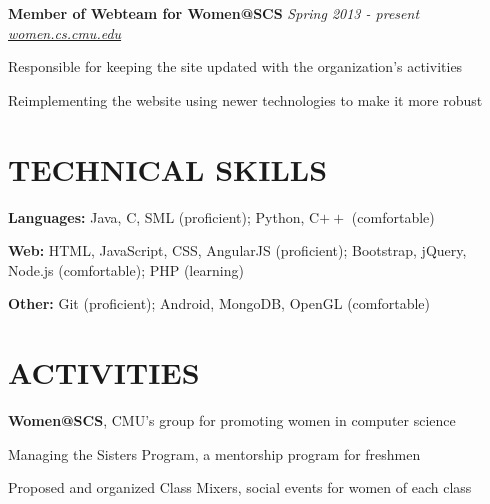 \documentclass[margin, 11pt]{res} %
\begin{document}
\begin{resume}
\vspace{3pt}

{\bf Member of Webteam for Women@SCS} \hfill {\sl Spring 2013 - present}\\
\href{{women.cs.cmu.edu}}{\sl women.cs.cmu.edu}

\begin{itemize} \itemsep -2pt
{\small \item Responsible for keeping the site updated with the organization's activities
\item Reimplementing the website using newer technologies to make it more robust}
\end{itemize}


\section{TECHNICAL SKILLS}

{\bf Languages:}
Java, C, SML (proficient); Python, C$++$ (comfortable)

\vspace{5pt}

{\bf Web:}
HTML, JavaScript, CSS, AngularJS (proficient); Bootstrap, jQuery, Node.js (comfortable); PHP (learning)

\vspace{5pt}

{\bf Other:}
Git (proficient); Android, MongoDB, OpenGL (comfortable)


\section{ACTIVITIES}

{\bf Women@SCS}, CMU's group for promoting women in computer science

\begin{itemize} \itemsep -2pt
{\small \item Managing the Sisters Program, a mentorship program for freshmen
\item Proposed and organized Class Mixers, social events for women of each class}
\end{itemize}


\end{resume}
\end{document}
